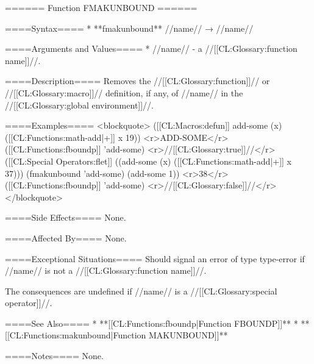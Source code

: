 ====== Function FMAKUNBOUND ======

====Syntax====
  * **fmakunbound** //name// → //name//

====Arguments and Values====
  * //name// - a //[[CL:Glossary:function name]]//.

====Description====
Removes the //[[CL:Glossary:function]]// or //[[CL:Glossary:macro]]// definition, if any, of //name// in the //[[CL:Glossary:global environment]]//.

====Examples====
<blockquote>
([[CL:Macros:defun]] add-some (x)
  ([[CL:Functions:math-add|+]] x 19)) 
<r>ADD-SOME</r>
([[CL:Functions:fboundp]] 'add-some) <r>//[[CL:Glossary:true]]//</r>
([[CL:Special Operators:flet]] ((add-some (x) ([[CL:Functions:math-add|+]] x 37)))
  (fmakunbound 'add-some)
  (add-some 1)) <r>38</r>
([[CL:Functions:fboundp]] 'add-some) <r>//[[CL:Glossary:false]]//</r>
</blockquote>

====Side Effects====
None.

====Affected By====
None.

====Exceptional Situations====
Should signal an error of type type-error if //name// is not a //[[CL:Glossary:function name]]//.

The consequences are undefined if //name// is a //[[CL:Glossary:special operator]]//.

====See Also====
  * **[[CL:Functions:fboundp|Function FBOUNDP]]**
  * **[[CL:Functions:makunbound|Function MAKUNBOUND]]**

====Notes====
None.

